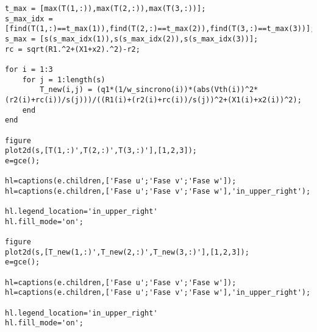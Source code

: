 \begin{lstlisting}
t_max = [max(T(1,:)),max(T(2,:)),max(T(3,:))];
s_max_idx = [find(T(1,:)==t_max(1)),find(T(2,:)==t_max(2)),find(T(3,:)==t_max(3))];
s_max = [s(s_max_idx(1)),s(s_max_idx(2)),s(s_max_idx(3))];
rc = sqrt(R1.^2+(X1+x2).^2)-r2;

for i = 1:3
    for j = 1:length(s)
        T_new(i,j) = (q1*(1/w_sincrono(i))*(abs(Vth(i))^2*(r2(i)+rc(i))/s(j)))/((R1(i)+(r2(i)+rc(i))/s(j))^2+(X1(i)+x2(i))^2);
    end
end

figure
plot2d(s,[T(1,:)',T(2,:)',T(3,:)'],[1,2,3]);
e=gce();

hl=captions(e.children,['Fase u';'Fase v';'Fase w']);
hl=captions(e.children,['Fase u';'Fase v';'Fase w'],'in_upper_right');

hl.legend_location='in_upper_right'
hl.fill_mode='on';

figure
plot2d(s,[T_new(1,:)',T_new(2,:)',T_new(3,:)'],[1,2,3]);
e=gce();

hl=captions(e.children,['Fase u';'Fase v';'Fase w']);
hl=captions(e.children,['Fase u';'Fase v';'Fase w'],'in_upper_right');

hl.legend_location='in_upper_right'
hl.fill_mode='on';
\end{lstlisting}


\pagebreak